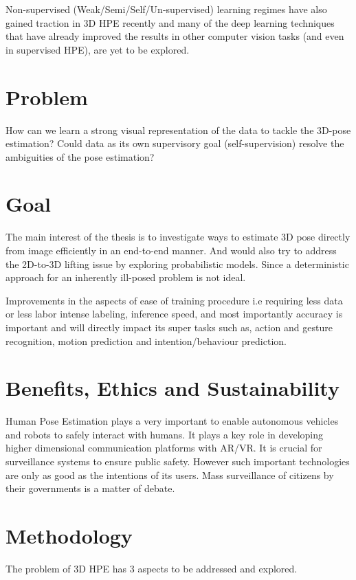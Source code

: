 Non-supervised (Weak/Semi/Self/Un-supervised) learning regimes have also gained traction in 3D HPE recently and many of the deep learning techniques that have already improved the results in other computer vision tasks (and even in supervised \ac{HPE}), are yet to be explored. 

\section{Problem}
How can we learn a strong visual representation of the data to tackle the 3D-pose estimation? Could data as its own supervisory goal (self-supervision) resolve the ambiguities of the pose estimation?


\section{Goal}

The main interest of the thesis is to investigate ways to estimate 3D pose directly from image efficiently in an end-to-end manner. And would also try to address the 2D-to-3D lifting issue by exploring probabilistic models. Since a deterministic approach for an inherently ill-posed problem is not ideal. 

Improvements in the aspects of ease of training procedure i.e requiring less data or less labor intense labeling, inference speed, and most importantly accuracy is important and will directly impact its super tasks such as, action and gesture recognition, motion prediction and intention/behaviour prediction.

\section{Benefits, Ethics and Sustainability}
Human Pose Estimation plays a very important to enable autonomous vehicles and robots to safely interact with humans. It plays a key role in developing higher dimensional communication platforms with \ac{AR/VR}. It is crucial for surveillance systems to ensure public safety. However such important technologies are only as good as the intentions of its users. Mass surveillance of citizens by their governments is a matter of debate.  

\section{Methodology}

The problem of 3D \ac{HPE} has 3 aspects to be addressed and explored. 


